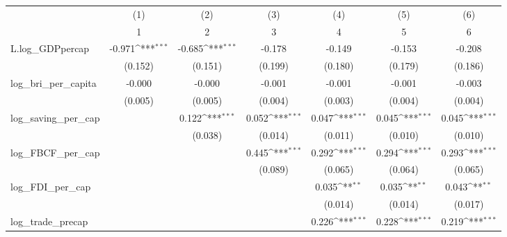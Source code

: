 {
\def\sym#1{\ifmmode^{#1}\else\(^{#1}\)\fi}
\begin{tabular}{l*{6}{c}}
\toprule
            &\multicolumn{1}{c}{(1)}&\multicolumn{1}{c}{(2)}&\multicolumn{1}{c}{(3)}&\multicolumn{1}{c}{(4)}&\multicolumn{1}{c}{(5)}&\multicolumn{1}{c}{(6)}\\
            &\multicolumn{1}{c}{1}&\multicolumn{1}{c}{2}&\multicolumn{1}{c}{3}&\multicolumn{1}{c}{4}&\multicolumn{1}{c}{5}&\multicolumn{1}{c}{6}\\
\midrule
L.log\_GDPpercap&      -0.971\sym{***}&      -0.685\sym{***}&      -0.178         &      -0.149         &      -0.153         &      -0.208         \\
            &     (0.152)         &     (0.151)         &     (0.199)         &     (0.180)         &     (0.179)         &     (0.186)         \\
\addlinespace
log\_bri\_per\_capita&      -0.000         &      -0.000         &      -0.001         &      -0.001         &      -0.001         &      -0.003         \\
            &     (0.005)         &     (0.005)         &     (0.004)         &     (0.003)         &     (0.004)         &     (0.004)         \\
\addlinespace
log\_saving\_per\_cap&                     &       0.122\sym{***}&       0.052\sym{***}&       0.047\sym{***}&       0.045\sym{***}&       0.045\sym{***}\\
            &                     &     (0.038)         &     (0.014)         &     (0.011)         &     (0.010)         &     (0.010)         \\
\addlinespace
log\_FBCF\_per\_cap&                     &                     &       0.445\sym{***}&       0.292\sym{***}&       0.294\sym{***}&       0.293\sym{***}\\
            &                     &                     &     (0.089)         &     (0.065)         &     (0.064)         &     (0.065)         \\
\addlinespace
log\_FDI\_per\_cap&                     &                     &                     &       0.035\sym{**} &       0.035\sym{**} &       0.043\sym{**} \\
            &                     &                     &                     &     (0.014)         &     (0.014)         &     (0.017)         \\
\addlinespace
log\_trade\_precap&                     &                     &                     &       0.226\sym{***}&       0.228\sym{***}&       0.219\sym{***}\\

\end{tabular}}
